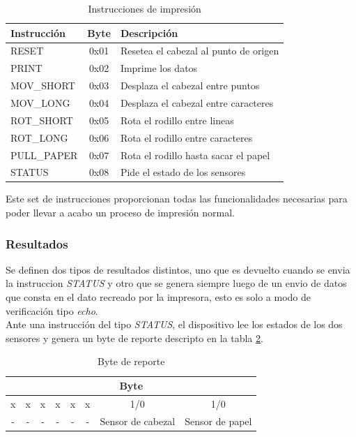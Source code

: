 \begin{table}[ht]
\centering
\begin{tabular}{|l|c|l|} 												\hline
\rowcolor[gray]{.9}
Instrucci\'on & Byte & Descripci\'on 								\\ 	\hline
RESET 		&	0x01	&	Resetea el cabezal	al punto de origen	\\	\hline
PRINT 		&	0x02	&	Imprime los datos						\\	\hline
MOV\_SHORT 	&  	0x03	&	Desplaza el cabezal entre puntos		\\	\hline
MOV\_LONG  	&  	0x04	&	Desplaza el cabezal entre caracteres	\\	\hline
ROT\_SHORT 	&	0x05	&	Rota el rodillo entre lineas			\\	\hline
ROT\_LONG   &	0x06	&	Rota el rodillo entre caracteres		\\	\hline
PULL\_PAPER	&	0x07	&	Rota el rodillo hasta sacar el papel	\\	\hline
STATUS		&	0x08	&	Pide el estado de los sensores			\\	\hline
\end{tabular}
\caption{Instrucciones de impresi\'on} 
\label{tab:instructions_set}
\end{table}

Este set de instrucciones proporcionan todas las funcionalidades necesarias
para poder llevar a acabo un proceso de impresi\'on normal.

\subsubsection{Resultados}
%
Se definen dos tipos de resultados distintos, uno que es devuelto cuando se
envia la instruccion \emph{STATUS} y otro que se genera siempre luego de un
envio de datos que consta en el dato recreado por la impresora, esto es solo a
modo de verificaci\'on tipo \emph{echo}.\\

Ante una instrucci\'on del tipo \emph{STATUS}, el dispositivo lee los estados
de los dos sensores y genera un byte de reporte descripto en la tabla
\ref{tab:report_byte}.


\begin{table}[ht]
\centering
\begin{tabular}{|c|c|c|c|c|c|c|c|}									\hline
\multicolumn{8}{|c|}{Byte}										\\	\hline
x & x & x & x & x & x & 1/0 & 1/0 								\\ 	\hline
- & - & - & - & - & - & Sensor de cabezal & Sensor de papel		\\	\hline
\end{tabular}
\caption{Byte de reporte} 
\label{tab:report_byte}
\end{table}

